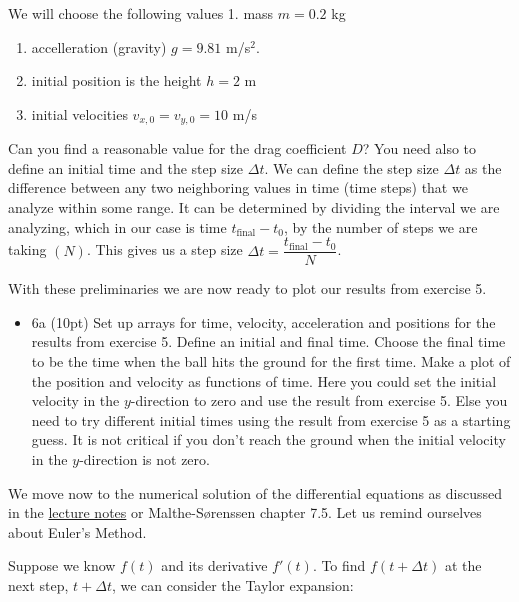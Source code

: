 \documentclass[11pt]{article}
\providecommand{\tightlist}{%
      \setlength{\itemsep}{0pt}\setlength{\parskip}{0pt}}
\begin{document}
    We will choose the following values 1. mass \(m=0.2\) kg

\begin{enumerate}
\def\labelenumi{\arabic{enumi}.}
\setcounter{enumi}{1}
\item
  accelleration (gravity) \(g=9.81\) m/s\(^{2}\).
\item
  initial position is the height \(h=2\) m
\item
  initial velocities \(v_{x,0}=v_{y,0}=10\) m/s
\end{enumerate}

Can you find a reasonable value for the drag coefficient \(D\)? You need
also to define an initial time and the step size \(\Delta t\). We can
define the step size \(\Delta t\) as the difference between any two
neighboring values in time (time steps) that we analyze within some
range. It can be determined by dividing the interval we are analyzing,
which in our case is time \(t_{\mathrm{final}}-t_0\), by the number of
steps we are taking \((N)\). This gives us a step size
\(\Delta t = \dfrac{t_{\mathrm{final}}-t_0}{N}\).

With these preliminaries we are now ready to plot our results from
exercise 5.

\begin{itemize}
\tightlist
\item
  6a (10pt) Set up arrays for time, velocity, acceleration and positions
  for the results from exercise 5. Define an initial and final time.
  Choose the final time to be the time when the ball hits the ground for
  the first time. Make a plot of the position and velocity as functions
  of time. Here you could set the initial velocity in the
  \(y\)-direction to zero and use the result from exercise 5. Else you
  need to try different initial times using the result from exercise 5
  as a starting guess. It is not critical if you don't reach the ground
  when the initial velocity in the \(y\)-direction is not zero.
\end{itemize}

We move now to the numerical solution of the differential equations as
discussed in the
\href{https://mhjensen.github.io/Physics321/doc/pub/motion/html/motion.html}{lecture
notes} or Malthe-Sørenssen chapter 7.5. Let us remind ourselves about
Euler's Method.

Suppose we know \(f(t)\) and its derivative \(f'(t)\). To find
\(f(t+\Delta t)\) at the next step, \(t+\Delta t\), we can consider the
Taylor expansion:
\end{document}
